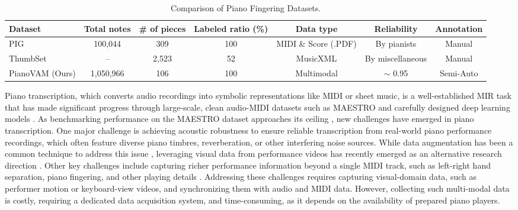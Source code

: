 \documentclass{article}
\begin{document}
\begin{table}
    \centering

    \small
    \begin{tabular}{lcccccc}
        \toprule
        \textbf{Dataset}  & \textbf{Total notes} & \textbf{\# of pieces} & \textbf{Labeled ratio (\%)} & \textbf{Data type} & \textbf{Reliability} & \textbf{Annotation} \\
        \midrule
        PIG \cite{InfoSci20Nakamura} & 100,044 & 309 & 100 & MIDI \& Score (.PDF) & By pianists & Manual \\
        ThumbSet \cite{MM22Ramoneda} & -- & 2,523 & 52 & MusicXML & By miscellaneous & Manual \\
        PianoVAM (Ours) & 1,050,966 & 106 & 100 & Multimodal & $\sim$ 0.95 & Semi-Auto \\
        \bottomrule
    \end{tabular}
\vspace{-2mm}    
\caption{Comparison of Piano Fingering Datasets.}
    \label{tab:fingering-datasets}
\vspace{-2mm}    
\end{table}

Piano transcription, which converts audio recordings into symbolic representations like MIDI or sheet music, is a well-established MIR task that has made significant progress through large-scale, clean audio-MIDI datasets such as MAESTRO \cite{ISMIR18Hawthorne} and carefully designed deep learning models \cite{TASLP21Kong, ISMIR22Wei}. As benchmarking performance on the MAESTRO dataset approaches its ceiling \cite{ISMIR24Yan}, new challenges have emerged in piano transcription. One major challenge is achieving acoustic robustness to ensure reliable transcription from real-world piano performance recordings, which often feature diverse piano timbres, reverberation, or other interfering noise sources. While data augmentation has been a common technique to address this issue \cite{ICLR19Hawthorne, Edwards2024}, leveraging visual data from performance videos has recently emerged as an alternative research direction \cite{CJE15Wan, DAFx21Wang, ICASSPW23Li, TASLP24Li}. Other key challenges include capturing richer performance information beyond a single MIDI track, such as left-right hand separation, piano fingering, and other playing details \cite{InfoSci20Nakamura, MM22Ramoneda}. Addressing these challenges requires capturing visual-domain data, such as performer motion or keyboard-view videos, and synchronizing them with audio and MIDI data. However, collecting such multi-modal data is costly, requiring a dedicated data acquisition system, and time-consuming, as it depends on the availability of prepared piano players. 
\end{document}
